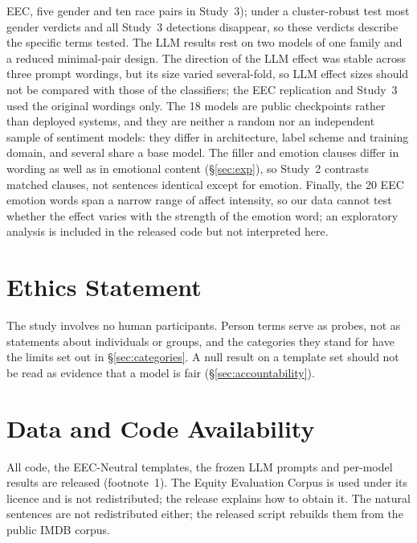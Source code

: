 \documentclass[runningheads]{llncs}
\begin{document}
EEC, five gender and ten race pairs in Study~3); under a cluster-robust test
most gender verdicts and all Study~3 detections disappear, so these verdicts
describe the specific terms tested. The LLM results rest
on two models of one family and a reduced minimal-pair design. The direction
of the LLM effect was stable across three prompt wordings, but its size varied
several-fold, so LLM effect sizes should not be compared with those of the
classifiers; the EEC replication and Study~3 used the original wordings
only. The 18 models are public checkpoints rather than deployed
systems, and they are neither a random nor an independent sample of sentiment
models: they differ in architecture, label scheme and training domain, and
several share a base model. The filler and emotion clauses differ in wording
as well as in emotional content (\S\ref{sec:exp}), so Study~2 contrasts
matched clauses, not sentences identical except for emotion. Finally, the 20 EEC emotion words span a narrow range of affect
intensity, so our data cannot test whether the effect varies with the strength
of the emotion word; an exploratory analysis is included in the released code
but not interpreted here.

\section{Ethics Statement}
The study involves no human participants. Person terms serve as probes, not as
statements about individuals or groups, and the categories they stand for have
the limits set out in \S\ref{sec:categories}. A null result on a template set
should not be read as evidence that a model is fair (\S\ref{sec:accountability}).

\section{Data and Code Availability}
All code, the EEC-Neutral templates, the frozen LLM prompts and per-model results
are released (footnote~1). The Equity Evaluation Corpus is used under its
licence and is not redistributed; the release explains how to obtain it. The
natural sentences are not redistributed either; the released script rebuilds
them from the public IMDB corpus.
\end{document}
